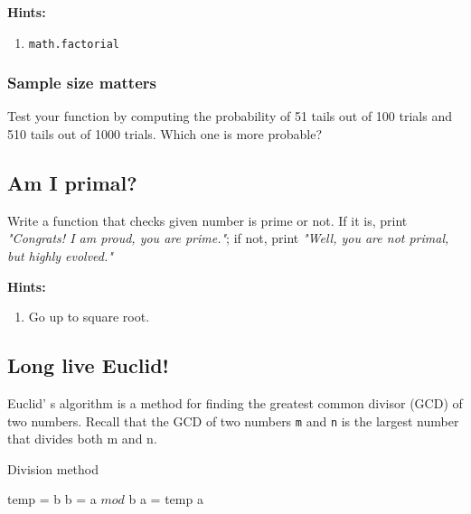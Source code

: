 \documentclass[a4paper]{article}
\begin{document}
\textbf{Hints:}
\begin{enumerate}
    \item \texttt{math.factorial}
\end{enumerate}

\subsubsection{Sample size matters}

Test your function by computing the probability of 51 tails out of 100 trials and 510 tails out of 1000 trials. Which one is more probable?

\newpage
\subsection{Am I primal?}

Write a function that checks given number is prime or not. If it is, print \textit{"Congrats! I am proud, you are prime."}; if not, print \textit{"Well, you are not primal, but highly evolved."}

\vspace{0.5cm}
\textbf{Hints:}
\begin{enumerate}
    \item Go up to square root.
\end{enumerate}

\newpage
\subsection{Long live Euclid!}
Euclid’ s algorithm is a method for finding the greatest common divisor (GCD) of two numbers. Recall that the GCD of two numbers \verb|m| and \verb|n| is the largest number that divides both m and n.

\begin{algorithm}
    \caption{Division method}
    \begin{algorithmic}[1]
                \State temp = b
                \State b = a $ mod $ b
                \State a = temp
            \EndWhile
            \State \Return a
        \EndFunction
    \end{algorithmic}
\end{algorithm}
\end{document}
